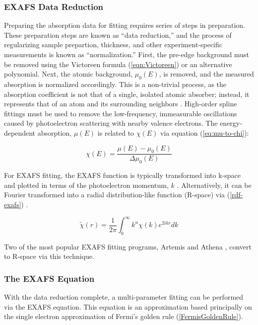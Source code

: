 \subsubsection{EXAFS Data Reduction}
Preparing the absorption data for fitting requires series of steps in preparation. These preparation steps are known as ``data reduction,'' and the process of regularizing sample prepartion, thickness, and other experiment-specific measurements is known as ``normalization.'' First, the pre-edge background must be removed using the Victoreen formula (\ref{eqn:Victoreen}) or an alternative polynomial. Next, the atomic background, $ \mu_0(E) $,  is removed, and the measured absorption is normalized accordingly. This is a non-trivial process, as the absorption coefficient is not that of a single, isolated atomic absorber; instead, it represents that of an atom and its surrounding neighbors \cite{rehrXAFS2000review}. High-order spline fittings must be used to remove the low-frequency, immeasurable oscillations caused by photoelectron scattering with nearby valence electrons. The energy-dependent absorption, $ \mu(E) $ is related to $ \chi(E) $ via equation (\ref{eq:mu-to-chi}): 

\begin{equation}
    \label{eq:mu-to-chi}
    \chi(E) = \dfrac{\mu(E) - \mu_0(E)}{\Delta \mu_0(E)}
\end{equation}

\noindent For EXAFS fitting, the EXAFS function is typically transformed into k-space and plotted in terms of the photoelectron momentum, $ k $ \cite{nicks-thesis}. Alternatively, it can be Fourier transformed into a radial distribution-like function (R-space) via (\ref{rdf-exafs}) \cite{exafsbook}.

\begin{equation}
    \label{rdf-exafs}
    \widetilde{\chi}(r) = \frac{1}{2\pi} \int_{0}^{\infty }  k^n \chi(k) e^{2ikr} dk
\end{equation}

\noindent Two of the most popular EXAFS fitting programs, Artemis and Athena \cite{artemis-and-athena}, convert to R-space via this technique.

\subsubsection{The EXAFS Equation}
With the data reduction complete, a multi-parameter fitting can be performed via the {EXAFS} equation. This equation is an approximation based principally on the single electron approximation of Fermi's golden rule (\ref{FermisGoldenRule}).

